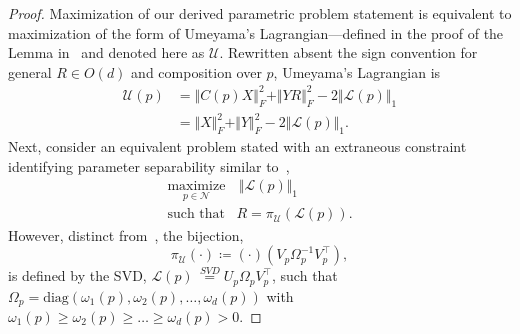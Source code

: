 \documentclass[pdflatex,iicol]{sn-jnl}%
\theoremstyle{thmstyleone}%
\theoremstyle{thmstyletwo}%
\theoremstyle{thmstylethree}%
\begin{document}
\begin{proof}
    Maximization of our derived parametric problem statement is equivalent to maximization of the form of Umeyama's Lagrangian---defined in the proof of the Lemma in~\cite{umeyama1991leastsquares} and denoted here as $\mathcal{U}$. Rewritten absent the sign convention for general $R\in O(d)$ and composition over $p$, Umeyama's Lagrangian is
    \begin{align}
        \mathcal{U}(p) &= \Vert C(p)X\Vert^2_F + \Vert YR\Vert^2_F - 2\Vert \mathcal{L}(p)\Vert_1 \\
        &= \Vert X\Vert^2_F + \Vert Y\Vert^2_F - 2\Vert \mathcal{L}(p)\Vert_1.\nonumber
    \end{align}
    Next, consider an equivalent problem stated with an extraneous constraint identifying parameter separability similar to~\cite{golub1973differentiation},
    $$
    \begin{matrix}   
    \underset{p \in \mathcal{N}}{\text{maximize}} & \,\Vert \mathcal{L}(p)\Vert_1\\
    \text{such that} & R = \pi_{\mathcal{U}}(\mathcal{L}(p)).
    \end{matrix}
    $$
    However, distinct from~\cite{golub1973differentiation}, the bijection, $$\pi_{\mathcal{U}}(\cdot) \coloneqq (\cdot)(V_p\Omega_p^{-1}V_p^{\top}),$$ is defined by the SVD, $\mathcal{L}(p) \,\overset{SVD}{=} U_p\Omega_pV_p^{\top}$, such that $\Omega_p = \text{diag}(\omega_1(p),\omega_2(p),\dots,\omega_d(p))$ with $\omega_1(p) \geq \omega_2(p)\geq \dots \geq \omega_d(p)>0$.


\end{proof}
\end{document}
